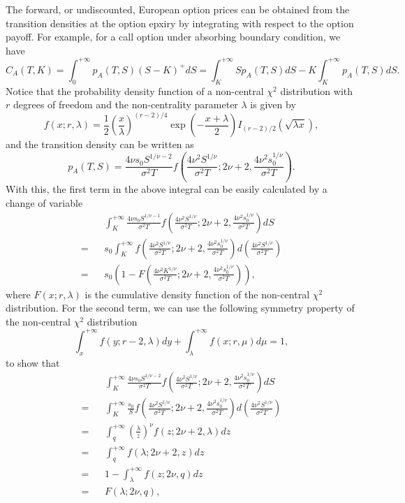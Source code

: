 \documentclass[12pt]{article}
\begin{document}
  The forward, or undiscounted, European option prices can be obtained from the transition
  densities at the option epxiry by integrating with respect to the
  option payoff. For example, for a call option under absorbing boundary condition, we have
  \begin{equation}
    C_A(T,K)=\int_0^{+\infty}p_A(T,S)(S-K)^+dS = \int_K^{+\infty}Sp_A(T,S)dS - K\int_K^{+\infty}p_A(T,S)dS.
  \end{equation}
  Notice that the probability density function of a non-central $\chi^2$ distribution with $r$ degrees of freedom and the non-centrality
  parameter $\lambda$ is given by
  \begin{equation}
    f(x;r,\lambda) = \frac{1}{2}\left(\frac{x}{\lambda}\right)^{(r-2)/4}\exp\left(-\frac{x+\lambda}{2}\right)I_{(r-2)/2}\left(\sqrt{\lambda x}\right),
  \end{equation}
  and the transition density can be written as
  \begin{equation}
    p_A(T,S) = \frac{4\nu s_0 S^{1/\nu-2}}{\sigma^2T}f\left(\frac{4\nu^2S^{1/\nu}}{\sigma^2T};2\nu+2,\frac{4\nu^2s_0^{1/\nu}}{\sigma^2T}\right).
  \end{equation}
  With this, the first term in the above integral can be easily calculated by a change of variable
  \begin{eqnarray}
      && \int_K^{+\infty}\frac{4\nu s_0 S^{1/\nu-1}}{\sigma^2T}f\left(\frac{4\nu^2S^{1/\nu}}{\sigma^2T};2\nu+2,\frac{4\nu^2s_0^{1/\nu}}{\sigma^2T}\right)dS\nonumber\\
    = && s_0\int_K^{+\infty}f\left(\frac{4\nu^2S^{1/\nu}}{\sigma^2T};2\nu+2,\frac{4\nu^2s_0^{1/\nu}}{\sigma^2T}\right)d\left(\frac{4\nu^2S^{1/\nu}}{\sigma^2T}\right)\nonumber\\
    = && s_0\left(1 - F\left(\frac{4\nu^2K^{1/\nu}}{\sigma^2T};2\nu+2,\frac{4\nu^2s_0^{1/\nu}}{\sigma^2T}\right)\right),
  \end{eqnarray}
  where $F(x;r,\lambda)$ is the cumulative density function of the non-central $\chi^2$ distribution.
  For the second term, we can use the following symmetry property of the non-central $\chi^2$ distribution
  \begin{equation}
    \int_x^{+\infty}f(y;r-2,\lambda)dy + \int_{\lambda}^{+\infty}f(x;r,\mu)d\mu = 1,
  \end{equation}
  to show that
  \begin{eqnarray}
      && \int_K^{+\infty}\frac{4\nu s_0 S^{1/\nu-2}}{\sigma^2T}f\left(\frac{4\nu^2S^{1/\nu}}{\sigma^2T};2\nu+2,\frac{4\nu^2s_0^{1/\nu}}{\sigma^2T}\right)dS\nonumber\\
    = && \int_K^{+\infty}\frac{s_0}{S}f\left(\frac{4\nu^2S^{1/\nu}}{\sigma^2T};2\nu+2,\frac{4\nu^2s_0^{1/\nu}}{\sigma^2T}\right)d\left(\frac{4\nu^2S^{1/\nu}}{\sigma^2T}\right)\nonumber\\
    = && \int_q^{+\infty}\left(\frac{\lambda}{z}\right)^{\nu}f\left(z;2\nu+2,\lambda\right)dz \nonumber\\
    = && \int_q^{+\infty}f\left(\lambda;2\nu+2,z\right)dz \nonumber\\
    = && 1 - \int_{\lambda}^{+\infty}f\left(z;2\nu,q\right)dz \nonumber\\
    = && F(\lambda; 2\nu, q),
  \end{eqnarray}
\end{document}
